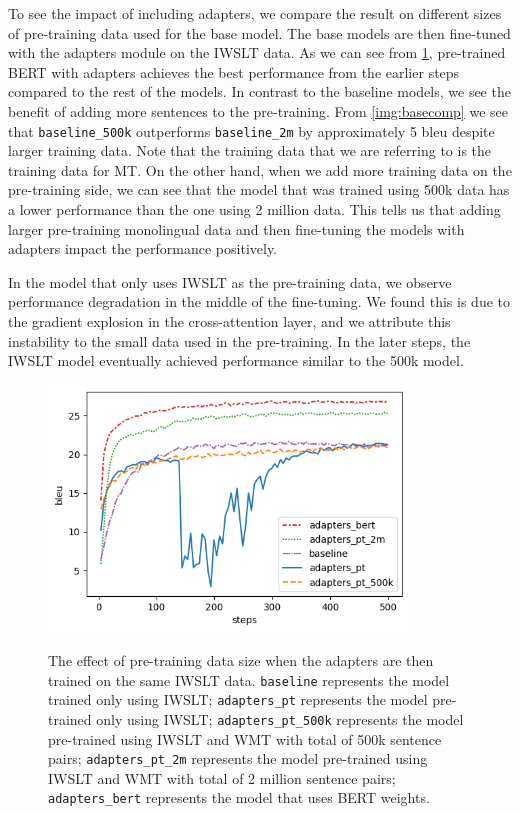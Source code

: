 To see the impact of including adapters, we compare the result on different sizes of pre-training data used for the base model. The base models are then fine-tuned with the adapters module on the IWSLT data. As we can see from \cref{img:adpcomp}, pre-trained BERT with adapters achieves the best performance from the earlier steps compared to the rest of the models. In contrast to the baseline models, we see the benefit of adding more sentences to the pre-training. From \cref{img:basecomp} we see that \texttt{baseline\_500k} outperforms \texttt{baseline\_2m} by approximately 5 bleu despite larger training data. Note that the training data that we are referring to is the training data for MT. On the other hand, when we add more training data on the pre-training side, we can see that the model that was trained using 500k data has a lower performance than the one using 2 million data. This tells us that adding larger pre-training monolingual data and then fine-tuning the models with adapters impact the performance positively.

In the model that only uses IWSLT as the pre-training data, we observe performance degradation in the middle of the fine-tuning. We found this is due to the gradient explosion in the cross-attention layer, and we attribute this instability to the small data used in the pre-training. In the later steps, the IWSLT model eventually achieved performance similar to the 500k model.
\begin{figure}[h]
    {\includegraphics[width=0.85\textwidth]{img/adapterscomparison.png}}
    \centering
    \caption[The effect of pre-training data size when the adapters are then trained on the same IWSLT data.]{
        The effect of pre-training data size when the adapters are then trained on the same IWSLT data. \texttt{baseline} represents the model trained only using IWSLT; \texttt{adapters\_pt} represents the model pre-trained only using IWSLT; \texttt{adapters\_pt\_500k} represents the model pre-trained using IWSLT and WMT with total of 500k sentence pairs; \texttt{adapters\_pt\_2m} represents the model pre-trained using IWSLT and WMT with total of 2 million sentence pairs; \texttt{adapters\_bert} represents the model that uses BERT weights.}
    \label{img:adpcomp}
\end{figure}

